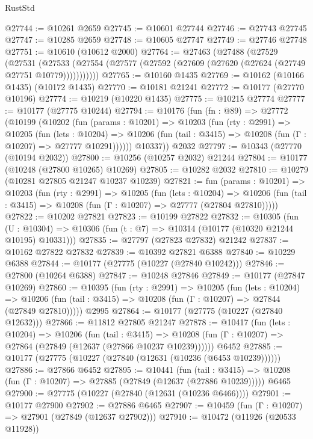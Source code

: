 \begin{lexlean}{RustStd}
\begin{coremodule}
@27744 := @10261 @2659
@27745 := @10601 @27744
@27746 := @27743 @27745
@27747 := @10285 @2659
@27748 := @10605 @27747
@27749 := @27746 @27748
@27751 := @10610 (@10612 @2000)
@27764 := @27463
    (@27488
      (@27529
        (@27531
          (@27533 (@27554 (@27577 (@27592 (@27609 (@27620 (@27624 (@27749 @27751 @10779)))))))))))
@27765 := @10160 @1435
@27769 := @10162 (@10166 @1435) (@10172 @1435)
@27770 := @10181 @21241
@27772 := @10177 (@27770 @10196)
@27774 := @10219 (@10220 @1435)
@27775 := @10215 @27774
@27777 := @10177 (@27775 @10244)
@27794 := @10176
    (fun (fn : @89) =>
    @27772
      (@10199
        (@10202
          (fun (params : @10201) =>
          @10203
            (fun (rty : @2991) =>
            @10205
              (fun (lets : @10204) =>
              @10206 (fun (tail : @3415) => @10208 (fun (Γ : @10207) => @27777 @10291))))))
        @10337))
    @2032
@27797 := @10343 (@27770 (@10194 @2032))
@27800 := @10256 (@10257 @2032) @21244
@27804 := @10177 (@10248 (@27800 @10265) @10269)
@27805 := @10282 @2032
@27810 := @10279 (@10281 @27805 @21247 @10237 @10239)
@27821 := fun (params : @10201) =>
  @10203
    (fun (rty : @2991) =>
    @10205
      (fun (lets : @10204) =>
      @10206 (fun (tail : @3415) => @10208 (fun (Γ : @10207) => @27777 (@27804 @27810)))))
@27822 := @10202 @27821
@27823 := @10199 @27822
@27832 := @10305
    (fun (U : @10304) => @10306 (fun (t : @7) => @10314 (@10177 (@10320 @21244 @10195) @10331)))
@27835 := @27797 (@27823 @27832) @21242
@27837 := @10162 @27822 @27832
@27839 := @10392 @27821 @6388
@27840 := @10229 @6388
@27844 := @10177 (@27775 (@10227 (@27840 @10242)))
@27846 := @27800 (@10264 @6388)
@27847 := @10248 @27846
@27849 := @10177 (@27847 @10269)
@27860 := @10395
    (fun (rty : @2991) =>
    @10205
      (fun (lets : @10204) =>
      @10206 (fun (tail : @3415) => @10208 (fun (Γ : @10207) => @27844 (@27849 @27810)))))
    @2995
@27864 := @10177 (@27775 (@10227 (@27840 @12632)))
@27866 := @11812 @27805 @21247
@27878 := @10417
    (fun (lets : @10204) =>
    @10206
      (fun (tail : @3415) =>
      @10208 (fun (Γ : @10207) => @27864 (@27849 (@12637 (@27866 @10237 @10239))))))
    @6452
@27885 := @10177 (@27775 (@10227 (@27840 (@12631 (@10236 (@6453 @10239))))))
@27886 := @27866 @6452
@27895 := @10441
    (fun (tail : @3415) => @10208 (fun (Γ : @10207) => @27885 (@27849 (@12637 (@27886 @10239)))))
    @6465
@27900 := @27775 (@10227 (@27840 (@12631 (@10236 @6466))))
@27901 := @10177 @27900
@27902 := @27886 @6465
@27907 := @10459 (fun (Γ : @10207) => @27901 (@27849 (@12637 @27902)))
@27910 := @10472 (@11926 (@20533 @11928))

\end{coremodule}
\end{lexlean}
